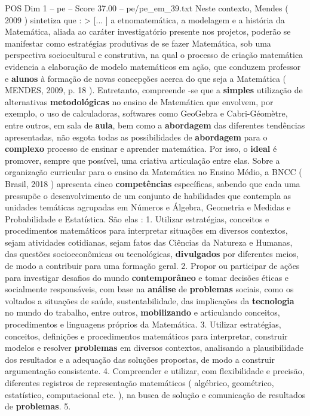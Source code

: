 \begin{textsample}{POS Dim 1 – pe – Score 37.00 – pe/pe\_em\_39.txt}
Neste contexto, Mendes ( 2009 ) sintetiza que : > [... ] a etnomatemática, a modelagem e a história da Matemática, aliada ao caráter investigatório presente nos projetos, poderão se manifestar como estratégias produtivas de se fazer Matemática, sob uma perspectiva sociocultural e construtiva, na qual o processo de criação matemática evidencia a elaboração de modelo matemáticos em ação, que conduzem professor e \textbf{alunos} à formação de novas concepções acerca do que seja a Matemática ( MENDES, 2009, p. 18 ).
Entretanto, compreende -se que a \textbf{simples} utilização de alternativas \textbf{metodológicas} no ensino de Matemática que envolvem, por exemplo, o uso de calculadoras, softwares como GeoGebra e Cabri-Géomètre, entre outros, em sala de \textbf{aula}, bem como a \textbf{abordagem} das diferentes tendências apresentadas, não esgota todas as possibilidades de \textbf{abordagem} para o \textbf{complexo} processo de ensinar e aprender matemática.
Por isso, o \textbf{ideal} é promover, sempre que possível, uma criativa articulação entre elas.
Sobre a organização curricular para o ensino da Matemática no Ensino Médio, a BNCC ( Brasil, 2018 ) apresenta cinco \textbf{competências} específicas, sabendo que cada uma pressupõe o desenvolvimento de um conjunto de habilidades que contempla as unidades temáticas agrupadas em Números e Álgebra, Geometria e Medidas e Probabilidade e Estatística.
São elas : 1.
Utilizar estratégias, conceitos e procedimentos matemáticos para interpretar situações em diversos contextos, sejam atividades cotidianas, sejam fatos das Ciências da Natureza e Humanas, das questões socioeconômicas ou tecnológicas, \textbf{divulgados} por diferentes meios, de modo a contribuir para uma formação geral. 2.
Propor ou participar de ações para investigar desafios do mundo \textbf{contemporâneo} e tomar decisões éticas e socialmente responsáveis, com base na \textbf{análise} de \textbf{problemas} sociais, como os voltados a situações de saúde, sustentabilidade, das implicações da \textbf{tecnologia} no mundo do trabalho, entre outros, \textbf{mobilizando} e articulando conceitos, procedimentos e linguagens próprios da Matemática. 3.
Utilizar estratégias, conceitos, definições e procedimentos matemáticos para interpretar, construir modelos e resolver \textbf{problemas} em diversos contextos, analisando a plausibilidade dos resultados e a adequação das soluções propostas, de modo a construir argumentação consistente. 4.
Compreender e utilizar, com flexibilidade e precisão, diferentes registros de representação matemáticos ( algébrico, geométrico, estatístico, computacional etc. ), na busca de solução e comunicação de resultados de \textbf{problemas}. 5.

\end{textsample}
